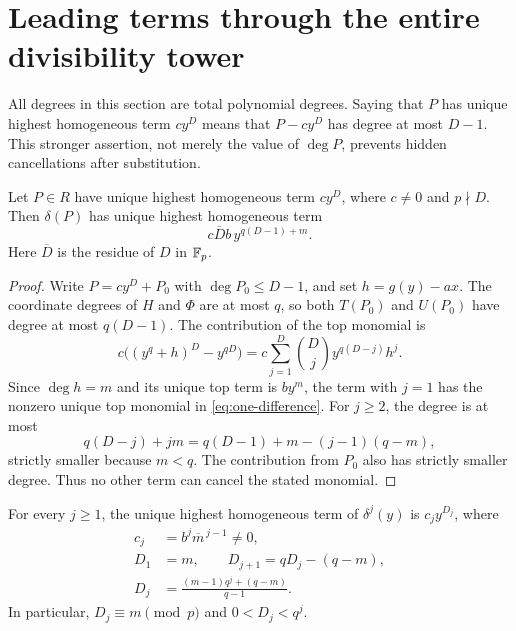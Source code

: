 \section{Leading terms through the entire divisibility tower}\label{sec:leading}

All degrees in this section are total polynomial degrees. Saying that
$P$ has unique highest homogeneous term $cy^D$ means that
$P-cy^D$ has degree at most $D-1$. This stronger assertion, not merely
the value of $\deg P$, prevents hidden cancellations after substitution.

\begin{lemma}\label{lem:difference}
Let $P\in R$ have unique highest homogeneous term $cy^D$, where
$c\ne0$ and $p\nmid D$. Then $\delta(P)$ has unique highest homogeneous
term
\begin{equation}\label{eq:one-difference}
 c\overline D b\,y^{q(D-1)+m}.
\end{equation}
Here $\overline D$ is the residue of $D$ in $\mathbb F_p$.
\end{lemma}

\begin{proof}
Write $P=cy^D+P_0$ with $\deg P_0\le D-1$, and set $h=g(y)-ax$.
The coordinate degrees of $H$ and $\Phi$ are at most $q$, so both
$T(P_0)$ and $U(P_0)$ have degree at most $q(D-1)$. The contribution
of the top monomial is
\[
 c\bigl((y^q+h)^D-y^{qD}\bigr)
 =c\sum_{j=1}^{D}\binom Dj y^{q(D-j)}h^j.
\]
Since $\deg h=m$ and its unique top term is $by^m$, the term with
$j=1$ has the nonzero unique top monomial in \eqref{eq:one-difference}.
For $j\ge2$, the degree is at most
\[
 q(D-j)+jm=q(D-1)+m-(j-1)(q-m),
\]
strictly smaller because $m<q$. The contribution from $P_0$ also has
strictly smaller degree. Thus no other term can cancel the stated
monomial.
\end{proof}

\begin{lemma}\label{lem:delta-iterates}
For every $j\ge1$, the unique highest homogeneous term of $\delta^j(y)$
is $c_jy^{D_j}$, where
\begin{align}
 c_j&=b^j\overline m^{\,j-1}\ne0,\label{eq:coefficient}\\
 D_1&=m,\qquad D_{j+1}=qD_j-(q-m),\label{eq:degree-recurrence}\\
 D_j&=\frac{(m-1)q^j+(q-m)}{q-1}.
 \label{eq:degree-closed}
\end{align}
In particular, $D_j\equiv m\pmod p$ and $0<D_j<q^j$.
\end{lemma}

